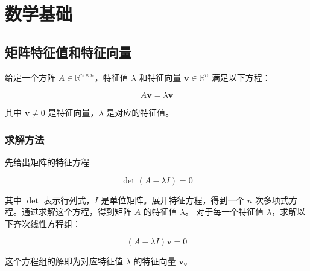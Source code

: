 \chapter{数学基础}\label{chap:background}
\section{矩阵特征值和特征向量}
\begin{defn}[特征值和特征向量]
    给定一个方阵 \( A \in \mathbb{R}^{n \times n} \)，特征值 \( \lambda \) 和特征向量 \( \mathbf{v} \in \mathbb{R}^n \) 满足以下方程：

\[
A \mathbf{v} = \lambda \mathbf{v}
\]

其中 \( \mathbf{v} \neq 0 \) 是特征向量，\( \lambda \) 是对应的特征值。
\end{defn}


\subsection{求解方法}

先给出矩阵的特征方程

    \[
    \det(A - \lambda I) = 0
    \]

其中 \( \det \) 表示行列式，\( I \) 是单位矩阵。展开特征方程，得到一个 \( n \) 次多项式方程。通过求解这个方程，得到矩阵 \( A \) 的特征值 \( \lambda \)。 对于每一个特征值 \( \lambda \)，求解以下齐次线性方程组：

    \[
    (A - \lambda I) \mathbf{v} = 0
    \]

这个方程组的解即为对应特征值 \( \lambda \) 的特征向量 \( \mathbf{v} \)。

